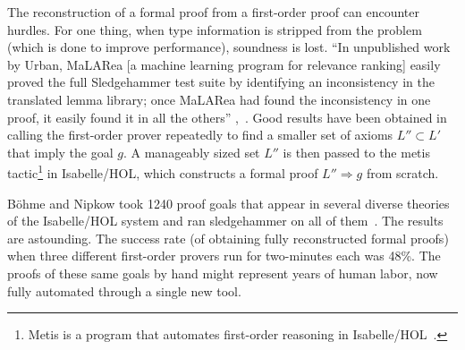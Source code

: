 \documentclass{llncs}
\begin{document}
The reconstruction of a
formal proof from a first-order proof can encounter hurdles.  For one thing, when type
information is stripped from the problem (which is done to improve
performance), soundness is lost.  ``In unpublished work by Urban,
MaLARea [a machine learning program for relevance ranking] easily
proved the full Sledgehammer test suite by identifying an
inconsistency in the translated lemma library; once MaLARea had found
the inconsistency in one proof, it easily found it in all the
others'' \cite{Paar},~\cite{UrM}. 
Good results have been obtained in calling the first-order prover
repeatedly to find a smaller set of axioms $L''\subset L'$ that imply
the goal $g$. A manageably sized set $L''$ is then passed to the metis
tactic\footnote{Metis is a program that automates first-order
  reasoning in Isabelle/HOL~\cite{Metis}.} in Isabelle/HOL, which
constructs a formal proof $L''\Longrightarrow g$ from scratch.



B\"ohme and Nipkow  %
took 1240 proof goals that appear in several diverse theories of the
Isabelle/HOL system and ran sledgehammer on all of
them~\cite{Boehme-Nipkow-IJCAR10}. The results are astounding. The
success rate (of obtaining fully reconstructed formal proofs) when
three different first-order provers run for two-minutes each was 48\%.
The proofs of these same goals by hand might represent years of human
labor, now fully automated through a single new tool.
\end{document}
